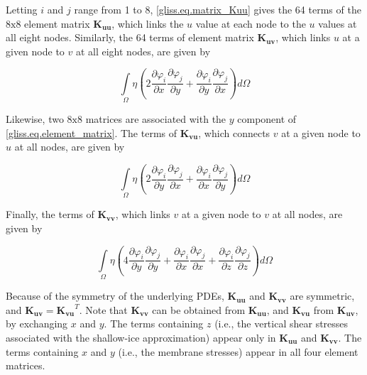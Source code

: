 \noindent
Letting $i$ and $j$ range from 1 to 8, \eqref{gliss.eq.matrix_Kuu} gives the 64 terms of the $8\text{x}8$ element matrix $\mathbf{K_{uu}}$,
which links the $u$ value at each node to the $u$ values at all eight nodes.
Similarly, the 64 terms of element matrix $\mathbf{K_{uv}}$, which links $u$ at a given node to $v$ at all eight nodes,
are given by

\begin{equation}
  \label{gliss.eq.matrix_Kuv}
  \int\limits_{\Omega }{\eta \left( 2\frac{\partial {{\varphi }_{i}}}{\partial x}\frac{\partial {{\varphi }_{j}}}{\partial y}+\frac{\partial {{\varphi }_{i}}}{\partial y}\frac{\partial {{\varphi }_{j}}}{\partial x} \right)}d\Omega
\end{equation}

Likewise, two $8\text{x}8$ matrices are associated with the $y$ component of \eqref{gliss.eq.element_matrix}.  
The terms of $\mathbf{K_{vu}}$, which connects $v$ at a given node to $u$ at all nodes, are given by

\begin{equation}
  \label{gliss.eq.matrix_Kvu}
  \int\limits_{\Omega }{\eta \left( 2\frac{\partial {{\varphi }_{i}}}{\partial y}\frac{\partial {{\varphi }_{j}}}{\partial x}+\frac{\partial {{\varphi }_{i}}}{\partial x}\frac{\partial {{\varphi }_{j}}}{\partial y} \right)}d\Omega
\end{equation}

\noindent
Finally, the terms of $\mathbf{K_{vv}}$, which links $v$ at a given node to $v$ at all nodes, are given by

\begin{equation}
  \label{gliss.eq.matrix_Kvv}
  \int\limits_{\Omega }{\eta \left( 4\frac{\partial {{\varphi }_{i}}}{\partial y}\frac{\partial {{\varphi }_{j}}}{\partial y}+\frac{\partial {{\varphi }_{i}}}{\partial x}\frac{\partial {{\varphi}_{j}}}{\partial x}+\frac{\partial {{\varphi }_{i}}}{\partial z}\frac{\partial {{\varphi }_{j}}}{\partial z} \right)}d\Omega
\end{equation}

Because of the symmetry of the underlying PDEs, $\mathbf{K_{uu}}$ and $\mathbf{K_{vv}}$ are symmetric,
and $\mathbf{K_{uv}} = \mathbf{K_{vu}}^{T}$.  Note that $\mathbf{K_{vv}}$ can be obtained from $\mathbf{K_{uu}}$, 
and $\mathbf{K_{vu}}$ from $\mathbf{K_{uv}}$, by exchanging $x$ and $y$.  The terms
containing $z$ (i.e., the vertical shear stresses associated with the shallow-ice approximation)
appear only in $\mathbf{K_{uu}}$ and $\mathbf{K_{vv}}$.  The terms containing $x$ and $y$ (i.e.,
the membrane stresses) appear in all four element matrices.


